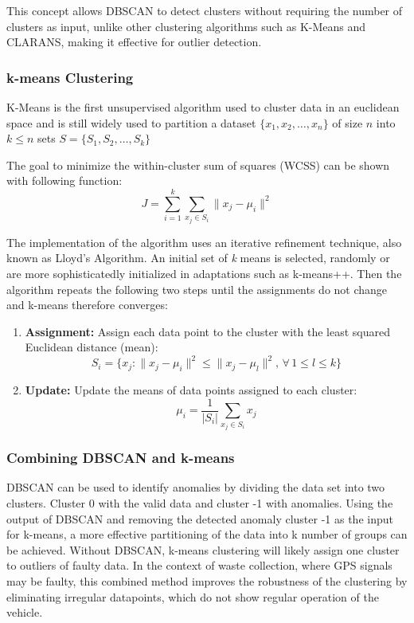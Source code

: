 \documentclass[a4paper,12pt,twoside]{scrreprt}
\begin{document}
This concept allows DBSCAN to detect clusters without
requiring the number of clusters as input, unlike other clustering algorithms
such as K-Means and CLARANS, making it effective for outlier detection.
\cite{ester_density-based_nodate}

\subsubsection{k-means Clustering}
K-Means is the first unsupervised algorithm used to cluster data in an
euclidean space and is still widely used to partition a dataset
$ \{x_1, x_2, \dots, x_n\}$ of size
$n$ into $k \leq n$ sets $S = \{S_1, S_2, \dots, S_k\}$ \cite{sinaga_pdf_2024}

The goal to minimize the within-cluster sum of squares (WCSS) can be shown with
following function:
\[
  J = \sum_{i=1}^{k} \sum_{x_j \in S_i} \| x_j - \mu_i \|^2
\]

The implementation of the algorithm uses an iterative refinement technique,
also known as Lloyd's Algorithm.
An initial set of \textit{k} means is selected, randomly or are more
sophisticatedly initialized in adaptations such as k-means++.
Then the algorithm repeats the following two steps until the assignments do not
change and k-means therefore converges:

\begin{enumerate}
  \item \textbf{Assignment:} Assign each data point to the cluster with the
        least squared Euclidean distance (mean):
        \[
          S_i = \{x_j : \| x_j - \mu_i \|^2 \leq \| x_j - \mu_l \|^2, \,
          \forall \, 1
          \leq l \leq k\}
        \]
  \item \textbf{Update:} Update the means of data points assigned to each
        cluster:
        \[
          \mu_i = \frac{1}{|S_i|} \sum_{x_j \in S_i} x_j
        \]
\end{enumerate}

\subsubsection{Combining DBSCAN and k-means}
DBSCAN can be used to identify anomalies by dividing the data set into two
clusters. Cluster 0 with the valid data and cluster -1 with anomalies. Using
the output of DBSCAN and removing the detected anomaly cluster -1 as the input
for k-means, a more effective partitioning of the data into k number of groups
can be achieved.
Without DBSCAN, k-means clustering will likely assign one cluster to outliers
of faulty data.
In the context of waste collection, where GPS signals may be faulty, this
combined method improves the robustness of the clustering by eliminating
irregular datapoints, which do not show regular operation of the vehicle.
\end{document}

